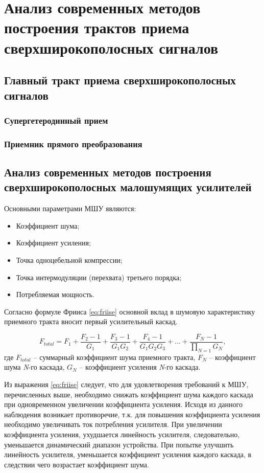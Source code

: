 \chapter{Анализ современных методов построения трактов приема сверхширокополосных сигналов}

\section{Главный тракт приема сверхширокополосных сигналов}
\subsection{Супергетеродинный прием}

\subsection{Приемник прямого преобразования}

\section{Анализ современных методов построения сверхширокополосных малошумящих усилителей}

Основными параметрами МШУ являются:
\begin{itemize}
	\item Коэффициент шума;
	\item Коэффициент усиления;
	\item Точка одноцебельной компрессии;
	\item Точка интермодуляции (перехвата) третьего порядка;
	\item Потребляемая мощность.
\end{itemize}

Согласно формуле Фрииса \eqref{eq:friise} основной вклад в шумовую характеристику приемного тракта вносит первый усилительный каскад.

\begin{equation}
F_{total} = F_1 + \frac{{F_2 - 1}}{G_1} + \frac{{F_3 - 1}}{G_1 G_2} + \frac{F_4 - 1}{G_1 G_2 G_3} + ... + \frac{F_N - 1}{\prod\limits_{N=1} G_N},
\label{eq:friise}
\end{equation}
где \(F_{total}\) -- суммарный коэффициент шума приемного тракта, \(F_N\) -- коэффициент шума \textit{N}-го каскада, \(G_N\) -- коэффициент усиления \textit{N}-го каскада.

Из выражения \eqref{eq:friise} следует, что для удовлетворения требований к МШУ, перечисленных выше, необходимо снижать коэффициент шума каждого каскада при одновременном увеличении коэффициента усиления. Исходя из данного наблюдения возникает противоречие, т.к. для повышения коэффициента усиления необходимо увеличивать ток потребления усилителя. При увеличении коэффициента усиления, ухудшается линейность усилителя, следовательно, уменьшается динамический диапазон устройства. При попытке улучшить линейность усилителя, уменьшается коэффициент усиления каждого каскада, в следствии чего возрастает коэффициент шума.

